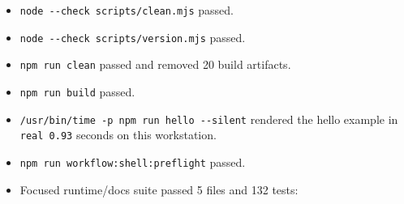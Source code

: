 \begin{itemize}
\item
  \texttt{n\allowbreak{}o\allowbreak{}d\allowbreak{}e\allowbreak{} \allowbreak{}-\allowbreak{}-\allowbreak{}c\allowbreak{}h\allowbreak{}e\allowbreak{}c\allowbreak{}k\allowbreak{} \allowbreak{}s\allowbreak{}c\allowbreak{}r\allowbreak{}i\allowbreak{}p\allowbreak{}t\allowbreak{}s\allowbreak{}/\allowbreak{}c\allowbreak{}l\allowbreak{}e\allowbreak{}a\allowbreak{}n\allowbreak{}.\allowbreak{}m\allowbreak{}j\allowbreak{}s} passed.
\item
  \texttt{n\allowbreak{}o\allowbreak{}d\allowbreak{}e\allowbreak{} \allowbreak{}-\allowbreak{}-\allowbreak{}c\allowbreak{}h\allowbreak{}e\allowbreak{}c\allowbreak{}k\allowbreak{} \allowbreak{}s\allowbreak{}c\allowbreak{}r\allowbreak{}i\allowbreak{}p\allowbreak{}t\allowbreak{}s\allowbreak{}/\allowbreak{}v\allowbreak{}e\allowbreak{}r\allowbreak{}s\allowbreak{}i\allowbreak{}o\allowbreak{}n\allowbreak{}.\allowbreak{}m\allowbreak{}j\allowbreak{}s} passed.
\item
  \texttt{n\allowbreak{}p\allowbreak{}m\allowbreak{} \allowbreak{}r\allowbreak{}u\allowbreak{}n\allowbreak{} \allowbreak{}c\allowbreak{}l\allowbreak{}e\allowbreak{}a\allowbreak{}n} passed and removed 20 build artifacts.
\item
  \texttt{n\allowbreak{}p\allowbreak{}m\allowbreak{} \allowbreak{}r\allowbreak{}u\allowbreak{}n\allowbreak{} \allowbreak{}b\allowbreak{}u\allowbreak{}i\allowbreak{}l\allowbreak{}d} passed.
\item
  \texttt{/\allowbreak{}u\allowbreak{}s\allowbreak{}r\allowbreak{}/\allowbreak{}b\allowbreak{}i\allowbreak{}n\allowbreak{}/\allowbreak{}t\allowbreak{}i\allowbreak{}m\allowbreak{}e\allowbreak{} \allowbreak{}-\allowbreak{}p\allowbreak{} \allowbreak{}n\allowbreak{}p\allowbreak{}m\allowbreak{} \allowbreak{}r\allowbreak{}u\allowbreak{}n\allowbreak{} \allowbreak{}h\allowbreak{}e\allowbreak{}l\allowbreak{}l\allowbreak{}o\allowbreak{} \allowbreak{}-\allowbreak{}-\allowbreak{}s\allowbreak{}i\allowbreak{}l\allowbreak{}e\allowbreak{}n\allowbreak{}t} rendered the hello example in \texttt{r\allowbreak{}e\allowbreak{}a\allowbreak{}l\allowbreak{} \allowbreak{}0\allowbreak{}.\allowbreak{}9\allowbreak{}3} seconds on this workstation.
\item
  \texttt{n\allowbreak{}p\allowbreak{}m\allowbreak{} \allowbreak{}r\allowbreak{}u\allowbreak{}n\allowbreak{} \allowbreak{}w\allowbreak{}o\allowbreak{}r\allowbreak{}k\allowbreak{}f\allowbreak{}l\allowbreak{}o\allowbreak{}w\allowbreak{}:\allowbreak{}s\allowbreak{}h\allowbreak{}e\allowbreak{}l\allowbreak{}l\allowbreak{}:\allowbreak{}p\allowbreak{}r\allowbreak{}e\allowbreak{}f\allowbreak{}l\allowbreak{}i\allowbreak{}g\allowbreak{}h\allowbreak{}t} passed.
\item
  Focused runtime/docs suite passed 5 files and 132 tests:


\end{itemize}
